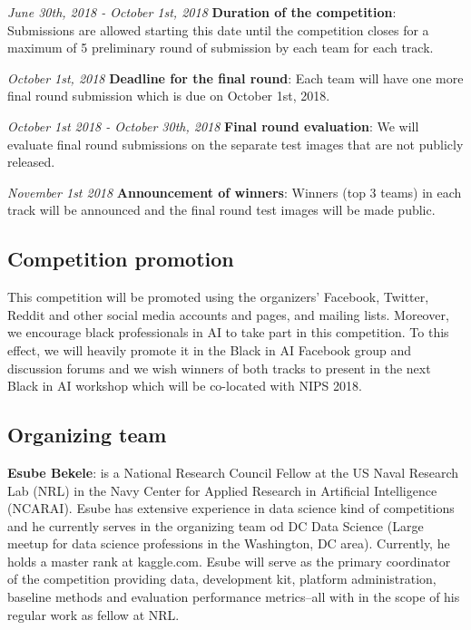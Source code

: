 \documentclass[11pt, oneside]{article}
\begin{document}
{\it June 30th, 2018 - October 1st, 2018} {\bf Duration of the competition}: 
Submissions are allowed starting this date until the competition closes for a 
maximum of 5 preliminary round of submission by each team for each track.

{\it October 1st, 2018} {\bf Deadline for the final round}: Each team will have 
one more final round submission which is due on October 1st, 2018.

{\it October 1st 2018 - October 30th, 2018} {\bf Final round evaluation}: We 
will evaluate final round submissions on the separate test images that are not 
publicly released.

{\it November 1st 2018} {\bf Announcement of winners}: Winners (top 3 teams) in 
each track will be announced and the final round test images will be made 
public.

\subsection{Competition promotion}

This competition will be promoted using the organizers' Facebook, Twitter, 
Reddit and other social media accounts and pages, and mailing lists. Moreover, 
we encourage black professionals in AI to take part in this competition. To 
this effect, we will heavily promote it in the Black in AI Facebook group and 
discussion forums and we wish winners of both tracks to present in the next 
Black in AI workshop which will be co-located with NIPS 2018.

\subsection{Organizing team}

{\bf Esube Bekele}: is a National Research Council Fellow at the US Naval
Research Lab (NRL) in the Navy Center for Applied Research in Artificial
Intelligence (NCARAI). Esube has extensive experience in data science kind of
competitions and he currently serves in the organizing team od DC Data Science
(Large meetup for data science professions in the Washington, DC area).
Currently, he holds a master rank at kaggle.com. Esube will serve as the
primary coordinator of the competition providing data, development kit,
platform administration, baseline methods and evaluation performance
metrics--all with in the scope of his regular work as fellow at NRL.
\end{document}
